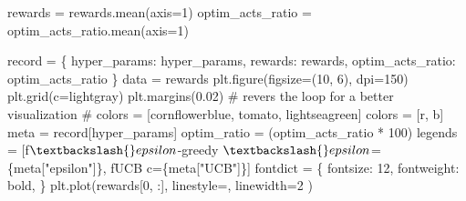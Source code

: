 \documentclass[
  letterpaper,
]{krantz}
\makeatletter
\newenvironment{Shaded}{\begin{snugshade}}{\end{snugshade}}
\newcommand{\CommentTok}[1]{\textcolor[rgb]{0.37,0.37,0.37}{#1}}
\newcommand{\DecValTok}[1]{\textcolor[rgb]{0.68,0.00,0.00}{#1}}
\newcommand{\FloatTok}[1]{\textcolor[rgb]{0.68,0.00,0.00}{#1}}
\newcommand{\NormalTok}[1]{\textcolor[rgb]{0.00,0.23,0.31}{#1}}
\newcommand{\OperatorTok}[1]{\textcolor[rgb]{0.37,0.37,0.37}{#1}}
\newcommand{\SpecialCharTok}[1]{\textcolor[rgb]{0.37,0.37,0.37}{#1}}
\newcommand{\SpecialStringTok}[1]{\textcolor[rgb]{0.13,0.47,0.30}{#1}}
\newcommand{\StringTok}[1]{\textcolor[rgb]{0.13,0.47,0.30}{#1}}
\newenvironment{kframe}{%
\medskip{}
\setlength{\fboxsep}{.8em}
 \def\at@end@of@kframe{}%
 \ifinner\ifhmode%
  \def\at@end@of@kframe{\end{minipage}}%
  \begin{minipage}{\columnwidth}%
 \fi\fi%
 \def\FrameCommand##1{\hskip\@totalleftmargin \hskip-\fboxsep
 \colorbox{shadecolor}{##1}\hskip-\fboxsep
     \hskip-\linewidth \hskip-\@totalleftmargin \hskip\columnwidth}%
 \MakeFramed {\advance\hsize-\width
   \@totalleftmargin\z@ \linewidth\hsize
   \@setminipage}}%
 {\par\unskip\endMakeFramed%
 \at@end@of@kframe}
\renewenvironment{Shaded}{\begin{kframe}}{\end{kframe}}
\theoremstyle{plain}
\theoremstyle{definition}
\theoremstyle{definition}
\theoremstyle{remark}
\makeatother
\begin{document}
\begin{codelisting}
\begin{Shaded}
\begin{Highlighting}[]
\NormalTok{    rewards }\OperatorTok{=}\NormalTok{ rewards.mean(axis}\OperatorTok{=}\DecValTok{1}\NormalTok{)}
\NormalTok{    optim\_acts\_ratio }\OperatorTok{=}\NormalTok{ optim\_acts\_ratio.mean(axis}\OperatorTok{=}\DecValTok{1}\NormalTok{)}
    
\NormalTok{    record }\OperatorTok{=}\NormalTok{ \{}
            \StringTok{\textquotesingle{}hyper\_params\textquotesingle{}}\NormalTok{: hyper\_params,}
            \StringTok{\textquotesingle{}rewards\textquotesingle{}}\NormalTok{: rewards,}
            \StringTok{\textquotesingle{}optim\_acts\_ratio\textquotesingle{}}\NormalTok{: optim\_acts\_ratio}
\NormalTok{            \}}
\NormalTok{    data }\OperatorTok{=}\NormalTok{ rewards}
\NormalTok{    plt.figure(figsize}\OperatorTok{=}\NormalTok{(}\DecValTok{10}\NormalTok{, }\DecValTok{6}\NormalTok{), dpi}\OperatorTok{=}\DecValTok{150}\NormalTok{)}
\NormalTok{    plt.grid(c}\OperatorTok{=}\StringTok{\textquotesingle{}lightgray\textquotesingle{}}\NormalTok{)}
\NormalTok{    plt.margins(}\FloatTok{0.02}\NormalTok{)}
    \CommentTok{\# revers the loop for a better visualization}
    \CommentTok{\# colors = [\textquotesingle{}cornflowerblue\textquotesingle{}, \textquotesingle{}tomato\textquotesingle{}, \textquotesingle{}lightseagreen\textquotesingle{}]}
\NormalTok{    colors }\OperatorTok{=}\NormalTok{ [}\StringTok{\textquotesingle{}r\textquotesingle{}}\NormalTok{, }\StringTok{\textquotesingle{}b\textquotesingle{}}\NormalTok{]}
\NormalTok{    meta }\OperatorTok{=}\NormalTok{ record[}\StringTok{\textquotesingle{}hyper\_params\textquotesingle{}}\NormalTok{]}
\NormalTok{    optim\_ratio }\OperatorTok{=}\NormalTok{ (optim\_acts\_ratio }\OperatorTok{*} \DecValTok{100}\NormalTok{)}
\NormalTok{    legends }\OperatorTok{=}\NormalTok{ [}\SpecialStringTok{f\textquotesingle{}$\textbackslash{}epsilon${-}greedy $\textbackslash{}epsilon$=}\SpecialCharTok{\{}\NormalTok{meta[}\StringTok{"epsilon"}\NormalTok{]}\SpecialCharTok{\}}\SpecialStringTok{\textquotesingle{}}\NormalTok{,}
               \SpecialStringTok{f\textquotesingle{}UCB c=}\SpecialCharTok{\{}\NormalTok{meta[}\StringTok{"UCB"}\NormalTok{]}\SpecialCharTok{\}}\SpecialStringTok{\textquotesingle{}}\NormalTok{]}
\NormalTok{    fontdict }\OperatorTok{=}\NormalTok{ \{}
            \StringTok{\textquotesingle{}fontsize\textquotesingle{}}\NormalTok{: }\DecValTok{12}\NormalTok{,}
            \StringTok{\textquotesingle{}fontweight\textquotesingle{}}\NormalTok{: }\StringTok{\textquotesingle{}bold\textquotesingle{}}\NormalTok{,}
\NormalTok{            \}}
\NormalTok{    plt.plot(rewards[}\DecValTok{0}\NormalTok{, :], linestyle}\OperatorTok{=}\StringTok{\textquotesingle{}{-}\textquotesingle{}}\NormalTok{, linewidth}\OperatorTok{=}\DecValTok{2}\NormalTok{ )}

\end{Highlighting}
\end{Shaded}
\end{codelisting}
\end{document}
